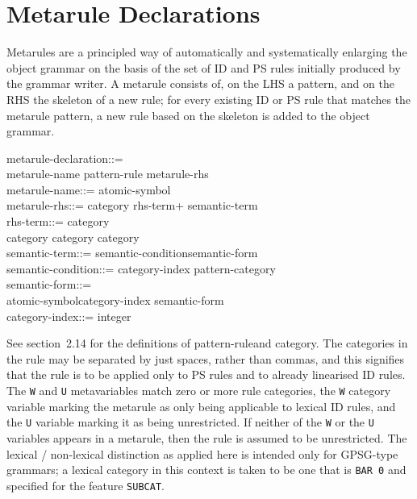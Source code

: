 \section{Metarule Declarations}

Metarules are a principled way of automatically and systematically
enlarging the object grammar on the basis of the set of ID and PS rules
initially produced by the grammar writer. A metarule consists of, on the
LHS a pattern, and on the RHS the skeleton of a new rule; for every
existing ID or PS rule that matches the metarule pattern, a new rule
based on the skeleton is added to the object grammar.
\begin{display}
\la metarule-declaration\ra ::=\\
\cont \la metarule-name\ra \lit{:} \la pattern-rule\ra \lit{==\ra} \la metarule-rhs\ra {}\\
\la metarule-name\ra ::= \la atomic-symbol\ra\\
\la metarule-rhs\ra ::= \la category\ra \lit{\twodash\ra} \la rhs-term\ran+ \la semantic-term\ran* {}\\
\la rhs-term\ra ::= \la category\ra \alt {} \alt {} \alt\\
\cont \lit{(} \la category\ra \lit{)} \alt \lit{(} \la category\ra \lit{)+} \alt \lit{(} \la category\ra \lit{)*}\\
\la semantic-term\ra ::= \lit{:} \la semantic-condition\ran* \la semantic-form\ra\\
\la semantic-condition\ra ::= \la category-index\ra \lit{=} \la pattern-category\ra \lit{,}\\
\la semantic-form\ra ::=\\
\cont \la atomic-symbol\ra \alt \la category-index\ra \alt \lit{(} \la semantic-form\ran* \lit{)}\\
\la category-index\ra ::= \la integer\ra
\end{display}
See section~2.14 for the definitions of \la pattern-rule\ra and \la category\ran.
The categories in the rule may be separated by just spaces, rather than
commas, and this signifies that the rule is to be applied only to PS
rules and to already linearised ID rules.  The {\tt W} and {\tt U}
metavariables match zero or more rule categories, the {\tt W} 
category variable marking the metarule as only being applicable to
lexical ID rules, and the {\tt U} variable marking it as being
unrestricted. If neither of the {\tt W} or the {\tt U} variables
appears in a metarule, then the rule is assumed to be unrestricted. The
lexical / non-lexical distinction as applied here is intended only for
GPSG-type grammars; a lexical category in this context is taken to be
one that is {\tt BAR 0} and specified for the feature {\tt SUBCAT}.

